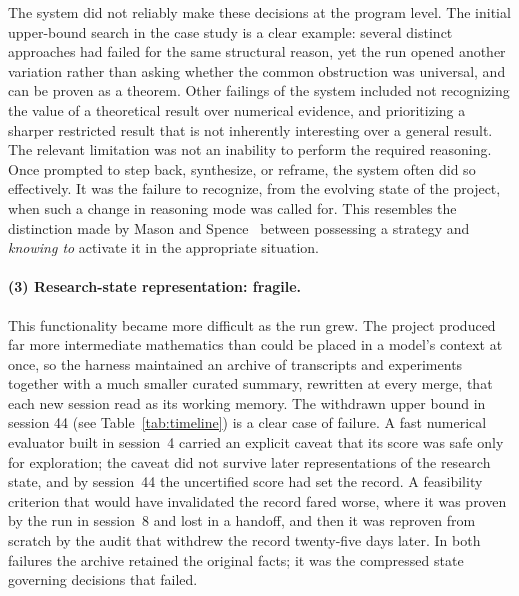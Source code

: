 The system did not reliably make these decisions at the program level. The initial
upper-bound search in the case study is a clear example: several distinct approaches had
failed for the same structural reason, yet the run opened another variation
rather than asking whether the common obstruction was universal, and can be proven as a theorem. Other failings of the system included not recognizing the value of a theoretical result over numerical evidence, and prioritizing a sharper restricted result that is not inherently interesting over a general result. The relevant limitation was not an inability to perform the required
reasoning. Once prompted to step back, synthesize, or reframe, the system
often did so effectively. It was the failure to recognize, from the evolving
state of the project, when such a change in reasoning mode was called for.
This resembles the distinction made by Mason and Spence~\cite{mason1999beyond} between possessing a strategy and
\emph{knowing to} activate it in the appropriate situation. 




\paragraph{(3) Research-state representation: fragile.}


This functionality became more difficult as the run grew. The project produced
far more intermediate mathematics than could be placed in a model's context
at once, so the harness maintained an archive of transcripts and experiments
together with a much smaller curated summary, rewritten at every merge, that
each new session read as its working memory. The withdrawn upper bound in session 44 (see Table~\ref{tab:timeline}) is a
clear case of failure. A fast numerical evaluator built in session~4 carried
an explicit caveat that its score was safe only for exploration; the caveat
did not survive later representations of the research state, and by
session~44 the uncertified score had set the record. A feasibility criterion
that would have invalidated the record fared worse, where it was proven by the run in
session~8 and lost in a handoff, and then it was reproven
from scratch by the audit that withdrew the record twenty-five days later. In both failures the archive retained
the original facts; it was the compressed state governing decisions that
failed.


